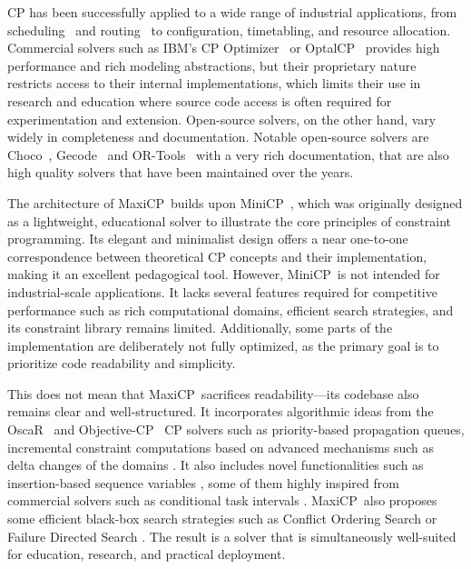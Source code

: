 \documentclass[11pt, a4paper]{scrartcl}
\newcommand{\ortools}{\textsf{OR-Tools}}
\newcommand{\gecode}{\textsf{Gecode}}
\newcommand{\choco}{\textsf{Choco}}
\newcommand{\maxicp}{\textsf{MaxiCP}}
\newcommand{\objectivecp}{\textsf{Objective-CP}}
\newcommand{\minicp}{\textsf{MiniCP}}
\newcommand{\oscar}{\textsf{OscaR}}
\begin{document}
CP has been successfully applied to a wide range of industrial applications, from scheduling~\cite{laborie2018ibm} and routing~\cite{kilby2006vehicle} to configuration,
timetabling, and resource allocation.
Commercial solvers such as IBM’s CP Optimizer~\cite{laborie2018ibm} or OptalCP~\cite{optalcp_solver} provides high performance and rich modeling abstractions,
but their proprietary nature restricts access to their internal implementations,
which limits their use in research and education where source code access is often required for experimentation and extension.
Open-source solvers, on the other hand, vary widely in completeness and documentation.
Notable open-source solvers are \choco~\cite{choco}, \gecode~\cite{gecode} and \ortools~\cite{ortools} with a very rich documentation,
that are also high quality solvers that have been maintained over the years.

The architecture of \maxicp\ builds upon \minicp~\cite{Michel2021MiniCP},
which was originally designed as a lightweight, educational solver to illustrate the core principles of constraint programming.
Its elegant and minimalist design offers a near one-to-one correspondence between theoretical CP concepts and their implementation,
making it an excellent pedagogical tool.
However, \minicp\ is not intended for industrial-scale applications.
It lacks several features required for competitive performance such as rich computational domains, efficient search strategies, and its constraint library remains limited.
Additionally, some parts of the implementation are deliberately not fully optimized, as the primary goal is to prioritize code readability and simplicity.

This does not mean that \maxicp\ sacrifices readability—its codebase also remains clear and well-structured.
It incorporates algorithmic ideas from the \oscar\ \cite{oscar} and \objectivecp\ \cite{van2013objective} CP solvers
such as priority-based propagation queues, incremental constraint computations based on advanced mechanisms such as delta changes of the domains \cite{sparsets2013domain}.
It also includes novel functionalities such as insertion-based sequence variables \cite{delecluse2022sequence,Schaus2022SeqVar,Schaus2022SeqVar},
some of them highly inspired from commercial solvers such as conditional task intervals \cite{LaborieR08,LaborieRSV09}.
\maxicp\ also proposes some efficient black-box search strategies such as Conflict Ordering Search \cite{conflictOrderingSearch} or Failure Directed Search \cite{failureDirectedSearch}.
The result is a solver that is simultaneously well-suited for education, research, and practical deployment.
\end{document}
